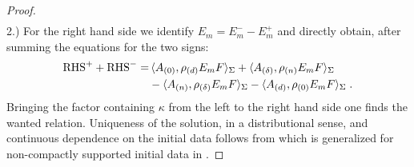 \begin{proof}
\begin{align}
\end{align}
2.) For the right hand side we identify $E_m = E_m^- - E_m^+$ and directly obtain, after summing the equations for the two signs:
\begin{align}
\textrm{RHS}^+ + \textrm{RHS}^-
=   &\,\langle {A_{(0)}} , \rho_{(d)} E_m F \rangle_\Sigma
  + \langle {A_{(\delta)}} , \rho_{(n)} E_m F \rangle_\Sigma \notag \\
  & -\langle {A_{(n)}} , \rho_{(\delta)} E_m F \rangle_\Sigma
  - \langle {A_{(d)}} , \rho_{(0)} E_m F \rangle_\Sigma \;.
\end{align}
Bringing the factor containing $\kappa$ from the left to the right hand side one finds the wanted relation. Uniqueness of the solution, in a distributional sense, and continuous dependence on the initial data follows from \cite[Theorem, 3.2.12]{baer_ginoux_pfaeffle} which is generalized for non-compactly supported initial data in \cite[Theorem 2.3]{Sanders}.
\end{proof}
%
%
%
%
%
%
%
%
%
%

